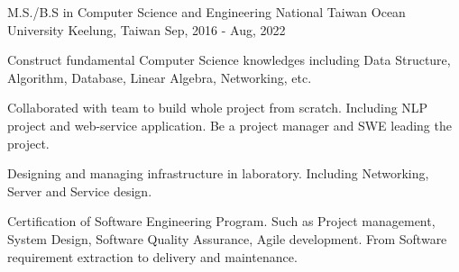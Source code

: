 

\begin{cventries}

  \cventry
    {M.S./B.S in Computer Science and Engineering} %
    {National Taiwan Ocean University} %
    {Keelung, Taiwan} %
    {Sep, 2016 - Aug, 2022} %
    {
      \begin{cvitems} %
        \item {Construct fundamental Computer Science knowledges including Data Structure, Algorithm,  Database, Linear Algebra, Networking, etc.}
        \item {Collaborated with team to build whole project from scratch. Including NLP project and web-service application. Be a project manager and SWE leading the project.}
        \item {Designing and managing infrastructure in laboratory. Including Networking, Server and Service design.}
        \item {Certification of Software Engineering Program. Such as Project management, System Design, Software Quality Assurance, Agile development. From Software requirement extraction to delivery and maintenance.}
      \end{cvitems}
    }


\end{cventries}

